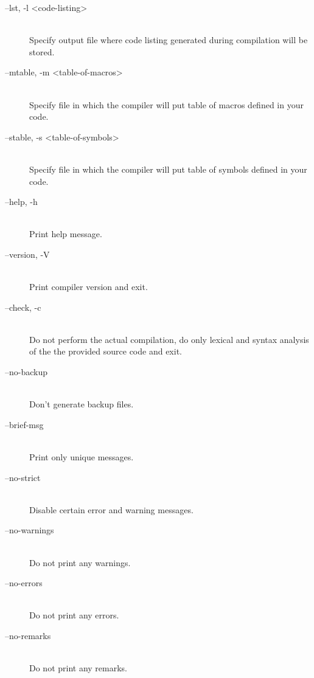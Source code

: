 \begin{description}
                \item[--lst, -l <code-listing>]~\\
                    Specify output file where code listing generated during compilation will be stored.

                \item[--mtable, -m <table-of-macros>]~\\
                    Specify file in which the compiler will put table of macros defined in your code.

                \item[--stable, -s <table-of-symbols>]~\\
                    Specify file in which the compiler will put table of symbols defined in your code.

                \item[--help, -h]~\\
                    Print help message.

                \item[--version, -V]~\\
                    Print compiler version and exit.

                \item[--check, -c]~\\
                    Do not perform the actual compilation, do only lexical and syntax analysis of the the provided source code and exit.

                \item[--no-backup]~\\
                    Don't generate backup files.

                \item[--brief-msg]~\\
                    Print only unique messages.

                \item[--no-strict]~\\
                    Disable certain error and warning messages.

                \item[--no-warnings]~\\
                    Do not print any warnings.

                \item[--no-errors]~\\
                    Do not print any errors.

                \item[--no-remarks]~\\
                    Do not print any remarks.


\end{description}
